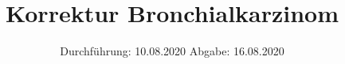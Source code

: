 

\subject{TPS Praktikum}
\title{Korrektur Bronchialkarzinom}
\date{%
	Durchführung: 10.08.2020
	\hspace{3em}
	Abgabe: 16.08.2020
}


	\maketitle
	\thispagestyle{empty}
	\tableofcontents
	\newpage

	
	
	
	

	\newpage

	\printbibliography{}



